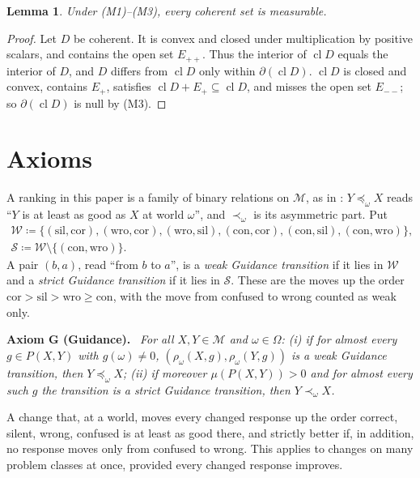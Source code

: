 \documentclass[11pt]{article}
\newcommand{\chg}[1]{{\color{red}#1}}
\newtheorem{lemma}[theorem]{Lemma}
\theoremstyle{definition}
\theoremstyle{remark}
\newenvironment{axiom}[1]{\par\medskip\noindent\textbf{Axiom #1.}\ \itshape}{\par\medskip}
\newcommand{\M}{\mathcal M}
\newcommand{\bd}{\partial}
\newcommand{\cl}{\operatorname{cl}}
\newcommand{\cor}{\mathrm{cor}}
\newcommand{\sil}{\mathrm{sil}}
\newcommand{\wro}{\mathrm{wro}}
\newcommand{\con}{\mathrm{con}}
\begin{document}
\begin{lemma}\label{lem:measurable}
Under (M1)--(M3), every coherent set is measurable.
\end{lemma}
\begin{proof}
Let $D$ be coherent. It is convex and closed under multiplication by positive scalars, and contains the open set $E_{++}$. Thus the interior of $\cl D$ equals the interior of $D$, and $D$ differs from $\cl D$ only within $\bd(\cl D)$. $\cl D$ is closed and convex, contains $E_+$, satisfies $\cl D+E_+\subseteq\cl D$, and misses the open set $E_{--}$; so $\bd(\cl D)$ is null by (M3).
\end{proof}

\section{Axioms}\label{sec:axioms}

A ranking in this paper is \chg{a family of binary relations on $\M$, as in \cite[\S\ref{GR-sec:framework}]{KonekGR}}: $Y\preceq_\omega X$ reads ``$Y$ is at least as good as $X$ at world $\omega$'', and $\prec_\omega$ is its asymmetric part. Put
\begin{gather*}
\mathcal W\coloneqq\{(\sil,\cor),(\wro,\cor),(\wro,\sil),(\con,\cor),(\con,\sil),(\con,\wro)\},\\
\mathcal S\coloneqq\mathcal W\setminus\{(\con,\wro)\}.
\end{gather*}
A pair $(b,a)$, read ``from $b$ to $a$'', is a \emph{weak Guidance transition} if it lies in $\mathcal W$ and a \emph{strict Guidance transition} if it lies in $\mathcal S$. These are the moves up the order $\cor>\sil>\wro\ge\con$, with the move from confused to wrong counted as weak only.

\begin{axiom}{G (Guidance)}
For all $X,Y\in\M$ and $\omega\in\Omega$:
\textup{(i)} if for almost every $g\in P(X,Y)$ with $g(\omega)\ne0$, $(\rho_\omega(X,g),\rho_\omega(Y,g))$ is a weak Guidance transition, then $Y\preceq_\omega X$;
\textup{(ii)} if moreover $\mu(P(X,Y))>0$ and for almost every such $g$ the transition is a strict Guidance transition, then $Y\prec_\omega X$.
\end{axiom}
\noindent A change that, at a world, moves every changed response up the order correct, silent, wrong, confused is at least as good there, and strictly better if, in addition, no response moves only from confused to wrong. This applies to changes on many problem classes at once, provided every changed response improves.
\end{document}
